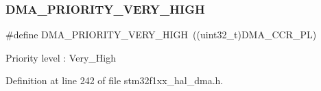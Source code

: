 \subsubsection{\texorpdfstring{D\+M\+A\+\_\+\+P\+R\+I\+O\+R\+I\+T\+Y\+\_\+\+V\+E\+R\+Y\+\_\+\+H\+I\+GH}{DMA\_PRIORITY\_VERY\_HIGH}}
{\footnotesize\ttfamily \#define D\+M\+A\+\_\+\+P\+R\+I\+O\+R\+I\+T\+Y\+\_\+\+V\+E\+R\+Y\+\_\+\+H\+I\+GH~((uint32\+\_\+t)D\+M\+A\+\_\+\+C\+C\+R\+\_\+\+PL)}

Priority level \+: Very\+\_\+\+High 

Definition at line 242 of file stm32f1xx\+\_\+hal\+\_\+dma.\+h.

